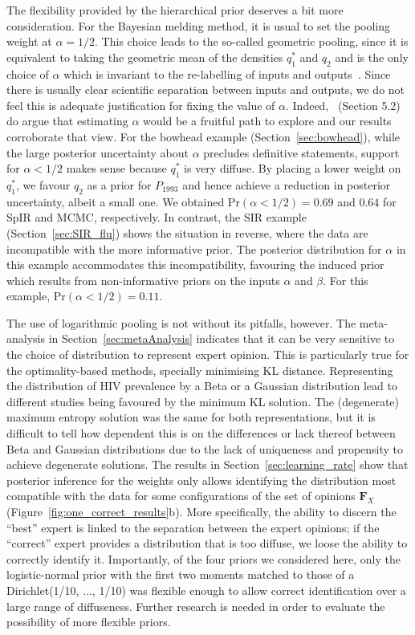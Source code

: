 \documentclass[a4paper, notitlepage, 10pt]{article}
\begin{document}
The flexibility provided by the hierarchical prior deserves a bit more consideration.
For the Bayesian melding method, it is usual to set the pooling weight at $\alpha = 1/2$.
This choice leads to the so-called geometric pooling, since it is equivalent to taking the geometric mean of the densities $q_1^\ast$ and $q_2$ and is the only choice of $\alpha$ which is invariant to the re-labelling of inputs and outputs~\citep{Poole2000}.
Since there is usually clear scientific separation between inputs and outputs, we do not feel this is adequate justification for fixing the value of $\alpha$.
Indeed,~\cite{Poole2000} (Section 5.2) do argue that estimating $\alpha$ would be a fruitful path to explore and our results corroborate that view.
For the bowhead example (Section~\ref{sec:bowhead}), while the large posterior uncertainty about $\alpha$ precludes definitive statements, support for $\alpha < 1/2$ makes sense because $q_1^\ast$ is very diffuse.
By placing a lower weight on $q_1^\ast$, we favour $q_2$ as a prior for $P_{1993}$ and hence achieve a reduction  in posterior uncertainty, albeit a small one.
We obtained $\text{Pr}(\alpha < 1/2) = 0.69$ and $0.64$ for SpIR and MCMC, respectively.
In contrast, the SIR example (Section~\ref{sec:SIR_flu}) shows the situation in reverse, where the data are incompatible with the more informative prior.
The posterior distribution for $\alpha$ in this example accommodates this incompatibility, favouring the induced prior which results from non-informative priors on the inputs $\alpha$ and $\beta$.
For this example, $\text{Pr}(\alpha < 1/2)= 0.11$.

The use of logarithmic pooling is not without its pitfalls, however.
The meta-analysis in Section~\ref{sec:metaAnalysis} indicates that it can be very sensitive to the choice of distribution to represent expert opinion.
This is particularly true for the optimality-based methods, specially minimising KL distance.
Representing the distribution of HIV prevalence by a Beta or a Gaussian distribution lead to different studies being favoured by the minimum KL solution.
The (degenerate) maximum entropy solution was the same for both representations, but it is difficult to tell how dependent this is on the differences or lack thereof between Beta and Gaussian distributions due to the lack of uniqueness and propensity to achieve degenerate solutions.
The results in Section~\ref{sec:learning_rate} show that posterior inference for the weights only allows identifying the distribution most compatible with the data for some configurations of the set of opinions $\boldsymbol F_X$ (Figure~\ref{fig:one_correct_results}b).
More specifically, the ability to discern the ``best'' expert is linked to the separation between the expert opinions; if the ``correct'' expert provides a distribution that is too diffuse, we loose the ability to correctly identify it.
Importantly, of the four priors we considered here, only the logistic-normal prior with the first two moments matched to those of a Dirichlet(1/10, $\ldots$, 1/10) was flexible enough to allow correct identification over a large range of diffuseness.
Further research is needed in order to evaluate the possibility of more flexible priors.
\end{document}
